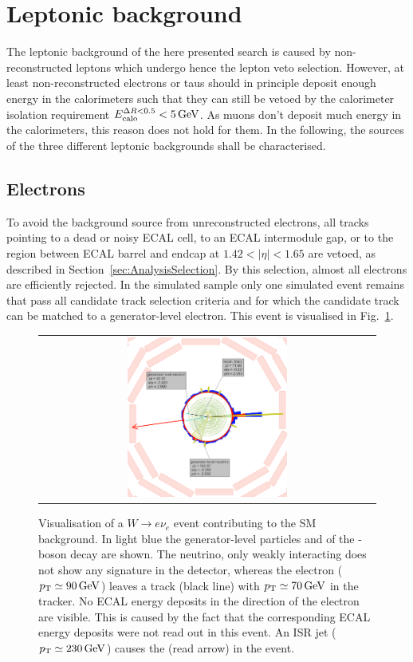 \section{Leptonic background}
\label{sec:LeptonicBkg}

The leptonic background of the here presented search is caused by non-reconstructed leptons which undergo hence the lepton veto selection.
However, at least non-reconstructed electrons or taus should in principle deposit enough energy in the calorimeters such that they can still be vetoed by the calorimeter isolation requirement $E^{\Delta R<0.5}_{\text{calo}}<5\,\text{Ge}\kern-0.06667em\text{V}$.
As muons don't deposit much energy in the calorimeters, this reason does not hold for them.
In the following, the sources of the three different leptonic backgrounds shall be characterised.

\subsection*{Electrons}
To avoid the background source from unreconstructed electrons, all tracks pointing to a dead or noisy ECAL cell, to an ECAL intermodule gap, or to the region between ECAL barrel and endcap at $1.42<|\eta|<1.65$ are vetoed, 
as described in Section~\ref{sec:AnalysisSelection}.
By this selection, almost all electrons are efficiently rejected.
In the simulated \WJets sample only one simulated event remains that pass all candidate track selection criteria and for which the candidate track can be matched to a generator-level electron.
This event is visualised in Fig.~\ref{fig:LostElectron}. 
\begin{figure}[!t]
  \centering 
  \begin{tabular}{c}
    \includegraphics[width=0.49\textwidth]{figures/analysis/Electron_lumi_279317_event_111637553.png}
  \end{tabular}
 \caption{Visualisation of a $W\rightarrow e\nu_e$ event contributing to the SM background. 
           In light blue the generator-level particles \lel and \nue of the \W-boson decay are shown. 
           The neutrino, only weakly interacting does not show any signature in the detector, whereas the electron ($p_{\text{T}}\simeq 90\,\text{Ge}\kern-0.06667em\text{V}$) leaves a track (black line) with \mbox{$p_{\text{T}}\simeq 70\,\text{Ge}\kern-0.06667em\text{V}$} in the tracker. 
           No ECAL energy deposits in the direction of the electron are visible. 
           This is caused by the fact that the corresponding ECAL energy deposits were not read out in this event.
           An ISR jet ($p_{\text{T}}\simeq 230\,\text{Ge}\kern-0.06667em\text{V}$) causes the \met (read arrow) in the event. }
  \label{fig:LostElectron}
\end{figure}
 
